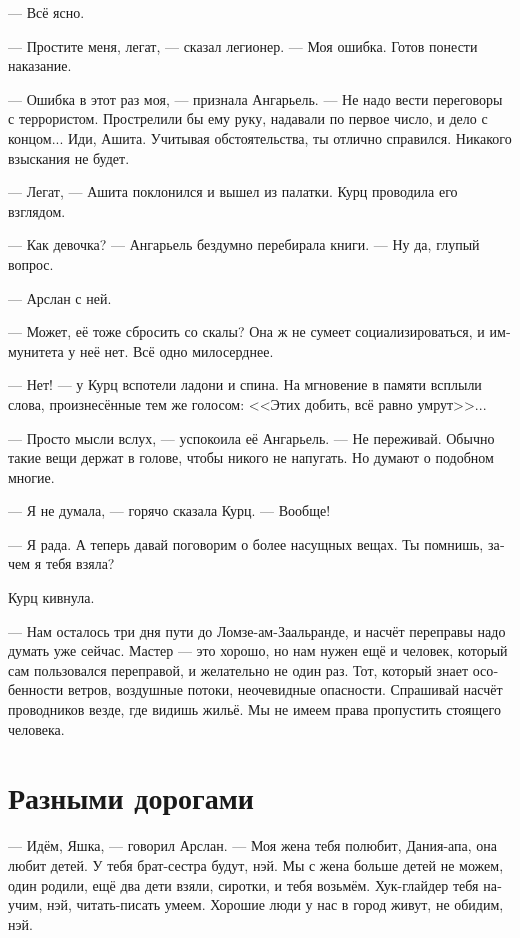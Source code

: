 \documentclass[a4paper,12pt,fleqn]{book}\usepackage{cooltooltips}\usepackage{polyglossia}\setdefaultlanguage[babelshorthands=true]{russian}\setotherlanguage{english}\defaultfontfeatures{Ligatures=TeX,Mapping=tex-text} \usepackage{xcolor}\definecolor{lightgray}{HTML}{bbbbbb}\color{lightgray}\newcommand{\ml}[3]{\textenglish{\textcolor{black}{#3}}}
\begin{document}
--- Всё ясно.

--- Простите меня, легат, --- сказал легионер.
--- Моя ошибка.
Готов понести наказание.

--- Ошибка в этот раз моя, --- признала Ангарьель.
--- Не надо вести переговоры с террористом.
Прострелили бы ему руку, надавали по первое число, и дело с концом...
Иди, Ашита.
Учитывая обстоятельства, ты отлично справился.
Никакого взыскания не будет.

--- Легат, --- Ашита поклонился и вышел из палатки.
Курц проводила его взглядом.

--- Как девочка? --- Ангарьель бездумно перебирала книги.
--- Ну да, глупый вопрос.

--- Арслан с ней.

--- Может, её тоже сбросить со скалы?
Она ж не сумеет социализироваться, и иммунитета у неё нет.
Всё одно милосерднее.

--- Нет! --- у Курц вспотели ладони и спина.
На мгновение в памяти всплыли слова, произнесённые тем же голосом:
<<Этих добить, всё равно умрут>>...

--- Просто мысли вслух, --- успокоила её Ангарьель.
--- Не переживай.
Обычно такие вещи держат в голове, чтобы никого не напугать.
Но думают о подобном многие.

--- Я не думала, --- горячо сказала Курц.
--- Вообще!

--- Я рада.
А теперь давай поговорим о более насущных вещах.
Ты помнишь, зачем я тебя взяла?

Курц кивнула.

--- Нам осталось три дня пути до Ломзе-ам-Заальранде, и насчёт переправы надо думать уже сейчас.
Мастер --- это хорошо, но нам нужен ещё и человек, который сам пользовался переправой, и желательно не один раз.
Тот, который знает особенности ветров, воздушные потоки, неочевидные опасности.
Спрашивай насчёт проводников везде, где видишь жильё.
Мы не имеем права пропустить стоящего человека.

\section{Разными дорогами}

--- Идём, Яшка, --- говорил Арслан.
--- Моя жена тебя полюбит, Дания-апа, она любит детей.
У тебя брат-сестра будут, нэй.
Мы с жена больше детей не можем, один родили, ещё два дети взяли, сиротки, и тебя возьмём.
Хук-глайдер тебя научим, нэй, читать-писать умеем.
Хорошие люди у нас в город живут, не обидим, нэй.
\end{document}
